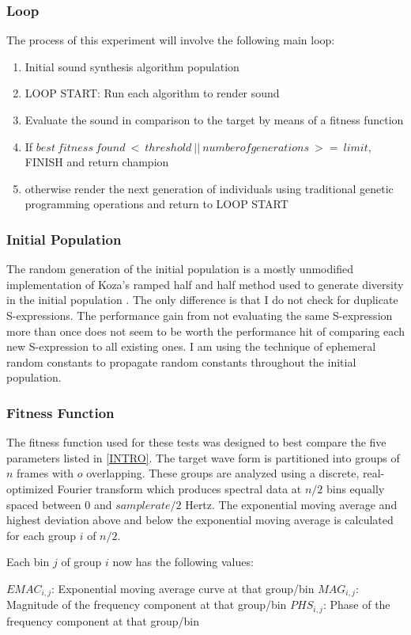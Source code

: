 \documentclass[12pt]{article}
\begin{document}
\subsubsection{Loop}
The process of this experiment will involve the following main loop:
\begin{enumerate}
\item
Initial sound synthesis algorithm population
\item
LOOP START:
Run each algorithm to render sound
\item
Evaluate the sound in comparison to the target by means of a fitness function
\item
If $best\ fitness\ found\ <\ threshold\ ||\ number of generations\ >=\ limit$, FINISH and return champion
\item
otherwise render the next generation of individuals using traditional genetic programming operations and return to LOOP START
\end{enumerate}
\subsubsection{Initial Population}
The random generation of the initial population is a mostly unmodified implementation of Koza's ramped half and half method used to generate diversity in the initial population \citep{koza1992genetic}. The only difference is that I do not check for duplicate S-expressions. The performance gain from not evaluating the same S-expression more than once does not seem to be worth the performance hit of comparing each new S-expression to all existing ones. I am using the technique of ephemeral random constants to propagate random constants throughout the initial population.
\subsubsection{Fitness Function}
The fitness function used for these tests was designed to best compare the five parameters listed in \ref{INTRO}. The target wave form is partitioned into groups of $n$ frames with $o$ overlapping. These groups are analyzed using a discrete, real-optimized Fourier transform which produces spectral data at $n/2$ bins equally spaced between $0$ and $sample rate/2$ Hertz. The exponential moving average and highest deviation above and below the exponential moving average is calculated for each group $i$ of $n/2$.

Each bin $j$ of group $i$ now has the following values:
\begin{enumerate}
$EMAC_{i, j}$: Exponential moving average curve at that group/bin
$MAG_{i, j}$: Magnitude of the frequency component at that group/bin
$PHS_{i, j}$: Phase of the frequency component at that group/bin
\end{enumerate}
\end{document}
